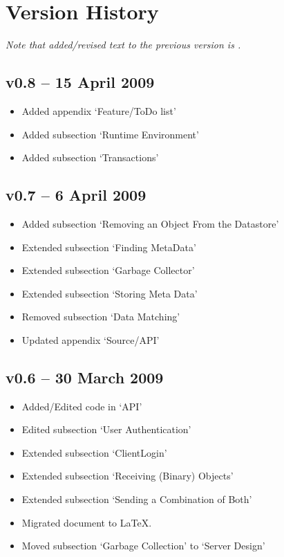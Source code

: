 \section{Version History}
\emph{Note that added/revised text to the previous version is .}

\subsection*{v0.8 -- 15 April 2009}
\begin{itemize}
  \item Added appendix `Feature/ToDo list'
  \item Added subsection `Runtime Environment'
  \item Added subsection `Transactions' 
\end{itemize}

\subsection*{v0.7 -- 6 April 2009}
\begin{itemize}
  \item Added subsection `Removing an Object From the Datastore'
  \item Extended subsection `Finding MetaData'
  \item Extended subsection `Garbage Collector'
  \item Extended subsection `Storing Meta Data'
  \item Removed subsection `Data Matching'
  \item Updated appendix `Source/API'
\end{itemize}

\subsection*{v0.6 -- 30 March 2009}
\begin{itemize}
  \item Added/Edited code in `API' 
  \item Edited subsection `User Authentication'
  \item Extended subsection `ClientLogin'
  \item Extended subsection `Receiving (Binary) Objects'
  \item Extended subsection `Sending a Combination of Both'
  \item Migrated document to \LaTeX.
  \item Moved subsection `Garbage Collection' to `Server Design'
\end{itemize}

